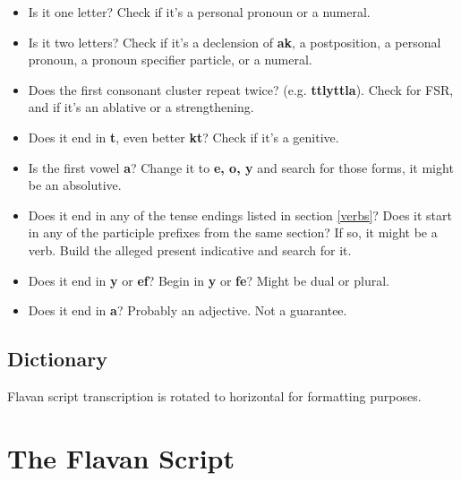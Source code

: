 \documentclass[10pt,oneside]{memoir}
\newcommand{\fsr}{FSR}
\begin{document}
\begin{itemize}
    \item Is it one letter? Check if it's a personal pronoun or a numeral.
    \item Is it two letters? Check if it's a declension of \textbf{ak}, a postposition, a personal pronoun, a pronoun specifier particle, or a numeral.
    \item Does the first consonant cluster repeat twice? (e.g. \textbf{ttlyttla}). Check for \fsr , and if it's an ablative or a strengthening.
    \item Does it end in \textbf{t}, even better \textbf{kt}? Check if it's a genitive.
    \item Is the first vowel \textbf{a}? Change it to \textbf{e, o, y} and search for those forms, it might be an absolutive.
    \item Does it end in any of the tense endings listed in section \ref{verbs}? Does it start in any of the participle prefixes from the same section? If so, it might be a verb. Build the alleged present indicative and search for it.
    \item Does it end in \textbf{y} or \textbf{ef}? Begin in \textbf{y} or \textbf{fe}? Might be dual or plural.
    \item Does it end in \textbf{a}? Probably an adjective. Not a guarantee.
\end{itemize}

\pagebreak

\section{Dictionary}

Flavan script transcription is rotated to horizontal for formatting purposes.

\begin{multicols}{3}

\end{multicols}


\chapter{The Flavan Script}\label{script}
\end{document}
